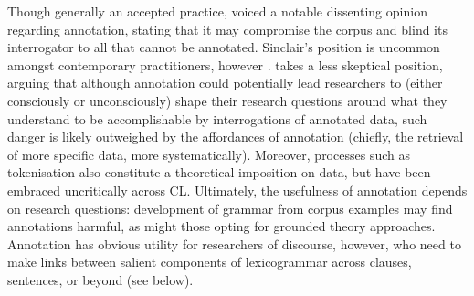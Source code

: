 Though generally an accepted practice, \textcite{sinclair_trust_2004} voiced a notable dissenting opinion regarding annotation, stating that it may compromise the \gls{corpus} and blind its interrogator to all that cannot be annotated. Sinclair's position is uncommon amongst contemporary practitioners, however \cite{archer_corpus_2012}. \textcite{hunston_corpus_2006} takes a less skeptical position, arguing that although annotation could potentially lead researchers to (either consciously or unconsciously) shape their research questions around what they understand to be accomplishable by interrogations of annotated data, such danger is likely outweighed by the affordances of annotation (chiefly, the retrieval of more specific data, more systematically). Moreover, processes such as tokenisation also constitute a theoretical imposition on data, but have been embraced uncritically across \gls{CL}. Ultimately, the usefulness of annotation depends on research questions: development of grammar from corpus examples may find annotations harmful, as might those opting for grounded theory approaches. Annotation has obvious utility for researchers of discourse, however, who need to make links between salient components of lexicogrammar across clauses, sentences, or beyond (see below).


